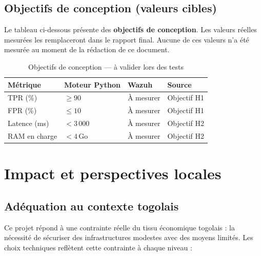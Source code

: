 \documentclass[11pt,a4paper]{article}
\begin{document}
\subsection{Objectifs de conception (valeurs cibles)}

\begin{warningbox}[title={Rappel — Valeurs cibles, pas résultats}]
Le tableau ci-dessous présente des \textbf{objectifs de conception}.
Les valeurs réelles mesurées les remplaceront dans le rapport final.
Aucune de ces valeurs n'a été mesurée au moment de la rédaction de ce document.
\end{warningbox}

\begin{table}[H]
\centering
\caption{Objectifs de conception — à valider lors des tests}
\small
\begin{tabularx}{\textwidth}{L{3.5cm} C{2.2cm} C{2.2cm} C{2.2cm}}
\toprule
{}
{\color{white}\textbf{Métrique}} &
{\color{white}\textbf{Moteur Python}} &
{\color{white}\textbf{Wazuh}} &
{\color{white}\textbf{Source}} \\
\midrule
TPR (\%) & $\geq 90$ & À mesurer & Objectif H1 \\
FPR (\%) & $\leq 10$ & À mesurer & Objectif H1 \\
Latence (ms) & $<3\,000$ & À mesurer & Objectif H2 \\
RAM en charge & $<4$\,Go & À mesurer & Objectif H2 \\
\bottomrule
\end{tabularx}
\end{table}

\section{Impact et perspectives locales}

\subsection{Adéquation au contexte togolais}

Ce projet répond à une contrainte réelle du tissu économique togolais :
la nécessité de sécuriser des infrastructures modestes avec des moyens limités.
Les choix techniques reflètent cette contrainte à chaque niveau :
\end{document}
